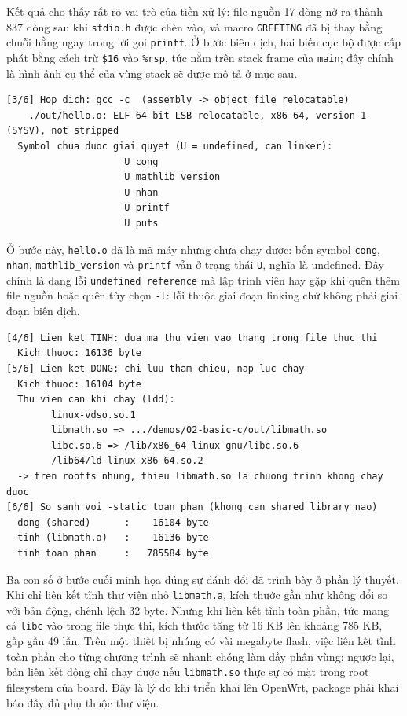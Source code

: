 \documentclass[11pt]{article}
\newcommand{\code}[1]{\texttt{#1}}
\begin{document}
Kết quả cho thấy rất rõ vai trò của tiền xử lý: file nguồn 17 dòng nở ra thành 837 dòng sau khi \code{stdio.h} được chèn vào, và macro \code{GREETING} đã bị thay bằng chuỗi hằng ngay trong lời gọi \code{printf}. Ở bước biên dịch, hai biến cục bộ được cấp phát bằng cách trừ \code{\$16} vào \code{\%rsp}, tức nằm trên stack frame của \code{main}; đây chính là hình ảnh cụ thể của vùng stack sẽ được mô tả ở mục sau.

\begin{lstlisting}[caption={Object file và symbol chưa giải quyết}]
[3/6] Hop dich: gcc -c  (assembly -> object file relocatable)
    ./out/hello.o: ELF 64-bit LSB relocatable, x86-64, version 1 (SYSV), not stripped
  Symbol chua duoc giai quyet (U = undefined, can linker):
                     U cong
                     U mathlib_version
                     U nhan
                     U printf
                     U puts
\end{lstlisting}

Ở bước này, \code{hello.o} đã là mã máy nhưng chưa chạy được: bốn symbol \code{cong}, \code{nhan}, \code{mathlib\_version} và \code{printf} vẫn ở trạng thái \code{U}, nghĩa là undefined. Đây chính là dạng lỗi \code{undefined reference} mà lập trình viên hay gặp khi quên thêm file nguồn hoặc quên tùy chọn \code{-l}: lỗi thuộc giai đoạn linking chứ không phải giai đoạn biên dịch.

\begin{lstlisting}[caption={So sánh liên kết tĩnh và liên kết động}]
[4/6] Lien ket TINH: dua ma thu vien vao thang trong file thuc thi
  Kich thuoc: 16136 byte
[5/6] Lien ket DONG: chi luu tham chieu, nap luc chay
  Kich thuoc: 16104 byte
  Thu vien can khi chay (ldd):
        linux-vdso.so.1
        libmath.so => .../demos/02-basic-c/out/libmath.so
        libc.so.6 => /lib/x86_64-linux-gnu/libc.so.6
        /lib64/ld-linux-x86-64.so.2
  -> tren rootfs nhung, thieu libmath.so la chuong trinh khong chay duoc
[6/6] So sanh voi -static toan phan (khong can shared library nao)
  dong (shared)      :    16104 byte
  tinh (libmath.a)   :    16136 byte
  tinh toan phan     :   785584 byte
\end{lstlisting}

Ba con số ở bước cuối minh họa đúng sự đánh đổi đã trình bày ở phần lý thuyết. Khi chỉ liên kết tĩnh thư viện nhỏ \code{libmath.a}, kích thước gần như không đổi so với bản động, chênh lệch 32 byte. Nhưng khi liên kết tĩnh toàn phần, tức mang cả \code{libc} vào trong file thực thi, kích thước tăng từ 16 KB lên khoảng 785 KB, gấp gần 49 lần. Trên một thiết bị nhúng có vài megabyte flash, việc liên kết tĩnh toàn phần cho từng chương trình sẽ nhanh chóng làm đầy phân vùng; ngược lại, bản liên kết động chỉ chạy được nếu \code{libmath.so} thực sự có mặt trong root filesystem của board. Đây là lý do khi triển khai lên OpenWrt, package phải khai báo đầy đủ phụ thuộc thư viện.
\end{document}
